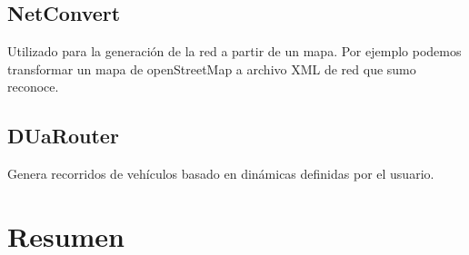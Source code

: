 \subsection{NetConvert}
Utilizado para la generación de la red a partir de un mapa. Por ejemplo podemos transformar un mapa de openStreetMap a archivo XML de red que sumo reconoce.

\subsection{DUaRouter}
 Genera recorridos de vehículos basado en dinámicas definidas por el usuario.



\section{Resumen}

